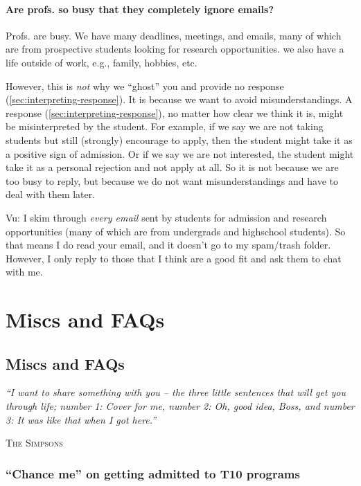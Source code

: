 \documentclass[oneside,11pt,dvipsnames]{book}
\newcommand{\myepigraphsimpsons}[1]{
\epigraph{\vspace{-0.2in} \emph{#1}}{\textsc{The Simpsons}}
}
\newenvironment{commentbox}[1][]{
  \small
  \begin{mybox}
    {\small \textbf{#1}}
  }{
  \end{mybox}
}
\begin{document}
\subsection{Are profs. so busy that they completely ignore emails?}\label{sec:busy}

Profs. are busy. We have many deadlines, meetings, and emails, many of which are from prospective students looking for research opportunities. we also have a life outside of work, e.g., family, hobbies, etc. 

However, this is \emph{not} why we ``ghost'' you and provide no response (\autoref{sec:interpreting-response}).  It is because we want to avoid misunderstandings.  A response (\autoref{sec:interpreting-response}), no matter how clear we think it is, might be misinterpreted by the student.  For example, if we say we are not taking students but still (strongly) encourage to apply, then the student might take it as a positive sign of admission. Or if we say we are not interested, the student might take it as a personal rejection and not apply at all.  So it is not because we are too busy to reply, but because we do not want misunderstandings and have to deal with them later. 




\begin{commentbox}{Vu: }
    I skim through \emph{every email} sent by students for admission and research opportunities (many of which are from undergrads and highschool students). So that means I do read your email, and it doesn't go to my spam/trash folder. 
    However, I only reply to those that I think are a good fit and ask them to chat with me.
    \end{commentbox}
    

\part{Miscs and FAQs}\label{part:faqs}
\chapter{Miscs and FAQs}\label{sec:faqs}

\myepigraphsimpsons{``I want to share something with you – the three little sentences that will get you through life; number 1: Cover for me, number 2: Oh, good idea, Boss, and number 3: It was like that when I got here.''}

\section{``Chance me'' on getting admitted to T10 programs}\label{sec:chance-me}
\end{document}

